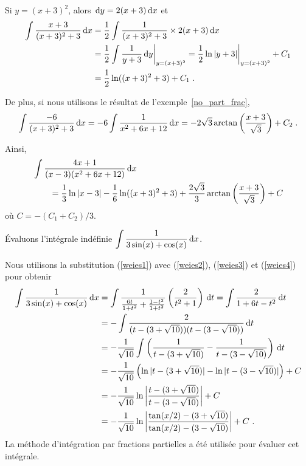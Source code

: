 {\begin{egg}[\eng]
Si $y=(x+3)^2$, alors $\,\mathrm{d}y = 2(x+3)\,\mathrm{d}x$ et
\begin{align*}
\int \frac{x+3}{(x+3)^2 + 3} \,\mathrm{d}x &=
\frac{1}{2} \int \frac{1}{(x+3)^2 + 3} \times 2(x+3)\,\mathrm{d}x \\
&= \frac{1}{2} \int \frac{1}{y + 3} \,\mathrm{d}y\bigg|_{y=(x+3)^2}
= \frac{1}{2} \ln|y+3|\bigg|_{y=(x+3)^2} + C_1 \\
&= \frac{1}{2} \ln((x+3)^2+3) + C_1 \; .
\end{align*}

De plus, si nous utilisons le résultat de l'exemple~\ref{no_part_frac},
\[
\int \frac{-6}{(x+3)^2 + 3} \,\mathrm{d}x =
-6 \int \frac{1}{x^2+6x+12} \,\mathrm{d}x =
-2\sqrt{3} \arctan\left(\frac{x+3}{\sqrt{3}}\right) + C_2 \; .
\]

Ainsi,
\begin{align*}
&\int \frac{4x+1}{(x-3)(x^2+6x+12)}  \,\mathrm{d}x \\
&\qquad = \frac{1}{3}\ln|x-3| 
-\frac{1}{6} \ln((x+3)^2+3)
+\frac{2\sqrt{3}}{3} \arctan\left(\frac{x+3}{\sqrt{3}}\right) + C
\end{align*}
où $C = -(C_1+C_2)/3$.
\end{egg}

\begin{egg}[\eng]
Évaluons l'intégrale indéfinie
$\displaystyle \int \frac{1}{3\sin(x)+\cos(x)} \,\mathrm{d}x$.

Nous utilisons la substitution (\ref{weies1}) avec (\ref{weies2}),
(\ref{weies3}) et (\ref{weies4}) pour obtenir
\begin{align*}
\int \frac{1}{3\sin(x)+\cos(x)} \,\mathrm{d}x
&= \int \frac{1}{\frac{6t}{1+t^2} + \frac{1-t^2}{1+t^2}}
\left(\frac{2}{t^2+1}\right) \,\mathrm{d}t
= \int \frac{2}{1+6t-t^2} \,\mathrm{d}t \\
&= -\int \frac{2}{(t-(3+\sqrt{10}))(t-(3-\sqrt{10}))} \,\mathrm{d}t \\
&= -\frac{1}{\sqrt{10}} \int \left( \frac{1}{t-(3+\sqrt{10})} -
\frac{1}{t-(3-\sqrt{10})}\right) \,\mathrm{d}t \\
&= -\frac{1}{\sqrt{10}} \left( \ln|t-(3+\sqrt{10})|
- \ln|t-(3-\sqrt{10})| \right) + C \\
&= -\frac{1}{\sqrt{10}} \ln\left|
\frac{t-(3+\sqrt{10})}{t-(3-\sqrt{10})}\right| + C \\
&= -\frac{1}{\sqrt{10}} \ln\left|
\frac{\tan(x/2)-(3+\sqrt{10})}{\tan(x/2)-(3-\sqrt{10})}\right| + C \ .
\end{align*}
La méthode d'intégration par fractions partielles a été utilisée pour
évaluer cet intégrale.
\end{egg}

}
